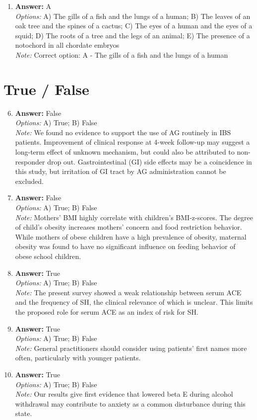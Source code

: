 \documentclass[12pt]{article}
\begin{document}
\begin{enumerate}[label=\arabic*.]
\\ \textit{Note:} Correct option: C - The use of the actual virulent variola virus may be dangerous if too much is administered
\item \textbf{Answer:} A
\\ \textit{Options:} A) The gills of a fish and the lungs of a human; B) The leaves of an oak tree and the spines of a cactus; C) The eyes of a human and the eyes of a squid; D) The roots of a tree and the legs of an animal; E) The presence of a notochord in all chordate embryos
\\ \textit{Note:} Correct option: A - The gills of a fish and the lungs of a human
\end{enumerate}

\section*{True / False}
\begin{enumerate}[label=\arabic*.]
\setcounter{enumi}{5}
\item \textbf{Answer:} False
\\ \textit{Options:} A) True; B) False
\\ \textit{Note:} We found no evidence to support the use of AG routinely in IBS patients. Improvement of clinical response at 4-week follow-up may suggest a long-term effect of unknown mechanism, but could also be attributed to non-responder drop out. Gastrointestinal (GI) side effects may be a coincidence in this study, but irritation of GI tract by AG administration cannot be excluded.
\item \textbf{Answer:} False
\\ \textit{Options:} A) True; B) False
\\ \textit{Note:} Mothers' BMI highly correlate with children's BMI-z-scores. The degree of child's obesity increases mothers' concern and food restriction behavior. While mothers of obese children have a high prevalence of obesity, maternal obesity was found to have no significant influence on feeding behavior of obese school children.
\item \textbf{Answer:} True
\\ \textit{Options:} A) True; B) False
\\ \textit{Note:} The present survey showed a weak relationship between serum ACE and the frequency of SH, the clinical relevance of which is unclear. This limits the proposed role for serum ACE as an index of risk for SH.
\item \textbf{Answer:} True
\\ \textit{Options:} A) True; B) False
\\ \textit{Note:} General practitioners should consider using patients' first names more often, particularly with younger patients.
\item \textbf{Answer:} True
\\ \textit{Options:} A) True; B) False
\\ \textit{Note:} Our results give first evidence that lowered beta E during alcohol withdrawal may contribute to anxiety as a common disturbance during this state.
\end{enumerate}
\end{document}
